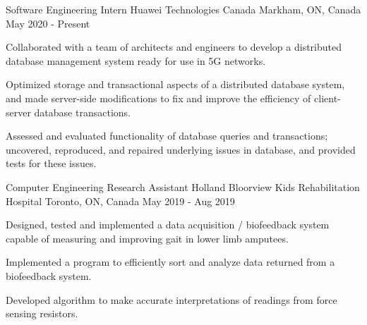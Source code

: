 

\begin{cventries}

  \cventry
    {Software Engineering Intern} %
    {Huawei Technologies Canada} %
    {Markham, ON, Canada} %
    {May 2020 - Present} %
    {
      \begin{cvitems} %
        \item {Collaborated with a team of architects and engineers to develop a distributed database management system ready for use in 5G networks.}
        \item {Optimized storage and transactional aspects of a distributed database system, and made server-side modifications to fix and improve the efficiency of client-server database transactions.}
        \item {Assessed and evaluated functionality of database queries and transactions; uncovered, reproduced, and repaired underlying issues in database, and provided tests for these issues.}
      \end{cvitems}
    }

  \cventry
    {Computer Engineering Research Assistant} %
    {Holland Bloorview Kids Rehabilitation Hospital} %
    {Toronto, ON, Canada} %
    {May 2019 - Aug 2019} %
    {
      \begin{cvitems} %
        \item {Designed, tested and implemented a data acquisition / biofeedback system capable of measuring and improving gait in lower limb amputees.}
        \item {Implemented a program to efficiently sort and analyze data returned from a biofeedback system.}
        \item {Developed algorithm to make accurate interpretations of readings from force sensing resistors.}
      \end{cvitems}
    }


\end{cventries}
